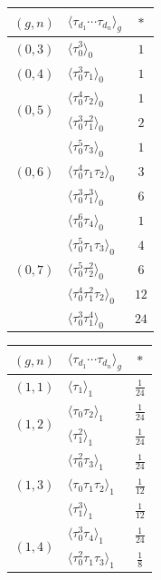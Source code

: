 \begin{exercise}[2.11]
\begin{table}[htbp]\centering\normalfont\footnotesize
\setlength{\tabcolsep}{4pt}
\begin{tabular}[t]{c l c}
\toprule
$(g,n)$ & $\langle\tau_{d_1}\cdots\tau_{d_n}\rangle_g$ & $*$\\
\midrule
$(0,3)$ & $\langle\tau_0^3\rangle_0$ & $1$\\
\midrule
$(0,4)$ & $\langle\tau_0^3\tau_1\rangle_0$ & $1$\\
\midrule
\multirow{2}{*}{$(0,5)$} & $\langle\tau_0^4\tau_2\rangle_0$ & $1$\\
 & $\langle\tau_0^3\tau_1^2\rangle_0$ & $2$\\
\midrule
\multirow{3}{*}{$(0,6)$} & $\langle\tau_0^5\tau_3\rangle_0$ & $1$\\
 & $\langle\tau_0^4\tau_1\tau_2\rangle_0$ & $3$\\
 & $\langle\tau_0^3\tau_1^3\rangle_0$ & $6$\\
\midrule
\multirow{5}{*}{$(0,7)$} & $\langle\tau_0^6\tau_4\rangle_0$ & $1$\\
 & $\langle\tau_0^5\tau_1\tau_3\rangle_0$ & $4$\\
 & $\langle\tau_0^5\tau_2^2\rangle_0$ & $6$\\
 & $\langle\tau_0^4\tau_1^2\tau_2\rangle_0$ & $12$\\
 & $\langle\tau_0^3\tau_1^4\rangle_0$ & $24$\\
\bottomrule
\end{tabular}\hspace{1.2em}%
\begin{tabular}[t]{c l c}
\toprule
$(g,n)$ & $\langle\tau_{d_1}\cdots\tau_{d_n}\rangle_g$ & $*$\\
\midrule
$(1,1)$ & $\langle\tau_1\rangle_1$ & $\frac{1}{24}$\\
\midrule
\multirow{2}{*}{$(1,2)$} & $\langle\tau_0\tau_2\rangle_1$ & $\frac{1}{24}$\\
 & $\langle\tau_1^2\rangle_1$ & $\frac{1}{24}$\\
\midrule
\multirow{3}{*}{$(1,3)$} & $\langle\tau_0^2\tau_3\rangle_1$ & $\frac{1}{24}$\\
 & $\langle\tau_0\tau_1\tau_2\rangle_1$ & $\frac{1}{12}$\\
 & $\langle\tau_1^3\rangle_1$ & $\frac{1}{12}$\\
\midrule
\multirow{5}{*}{$(1,4)$} & $\langle\tau_0^3\tau_4\rangle_1$ & $\frac{1}{24}$\\
 & $\langle\tau_0^2\tau_1\tau_3\rangle_1$ & $\frac{1}{8}$\\

\end{tabular}
\end{table}
\end{exercise}
